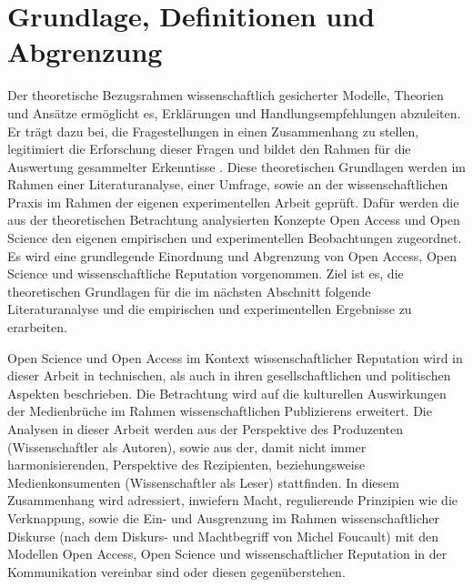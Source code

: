 \chapter{Grundlage, Definitionen und Abgrenzung} 

Der theoretische Bezugsrahmen wissenschaftlich gesicherter Modelle, Theorien und Ansätze ermöglicht es, Erklärungen und Handlungsempfehlungen abzuleiten\cite{martin_2007_wissenschaftstheorie}. Er trägt dazu bei, die Fragestellungen in einen Zusammenhang zu stellen, legitimiert die Erforschung dieser Fragen und bildet den Rahmen für die Auswertung gesammelter Erkenntisse \cite{suchen}. 
Diese theoretischen Grundlagen werden im Rahmen einer Literaturanalyse, einer Umfrage, sowie an der wissenschaftlichen Praxis im Rahmen der eigenen experimentellen Arbeit geprüft. Dafür werden die aus der theoretischen Betrachtung analysierten Konzepte Open Access und Open Science den eigenen empirischen und experimentellen Beobachtungen zugeordnet. Es wird eine grundlegende Einordnung und Abgrenzung von Open Access, Open Science und wissenschaftliche Reputation vorgenommen. Ziel ist es, die theoretischen Grundlagen für die im nächsten Abschnitt folgende Literaturanalyse und die empirischen und experimentellen Ergebnisse zu erarbeiten. 

Open Science und Open Access im Kontext wissenschaftlicher Reputation wird in dieser Arbeit in technischen, als auch in ihren gesellschaftlichen und politischen Aspekten beschrieben. Die Betrachtung wird auf die kulturellen Auswirkungen der Medienbrüche im Rahmen wissenschaftlichen Publizierens erweitert. Die Analysen in dieser Arbeit werden aus der Perspektive des Produzenten (Wissenschaftler als Autoren), sowie aus der, damit nicht immer harmonisierenden, Perspektive des Rezipienten, beziehungsweise Medienkonsumenten (Wissenschaftler als Leser) stattfinden. In diesem Zusammenhang wird adressiert, inwiefern Macht, regulierende Prinzipien wie die Verknappung, sowie die Ein- und Ausgrenzung im Rahmen wissenschaftlicher Diskurse (nach dem Diskurs- und Machtbegriff von Michel Foucault) mit den Modellen Open Access, Open Science und wissenschaftlicher Reputation in der Kommunikation vereinbar sind oder diesen gegenüberstehen. 

